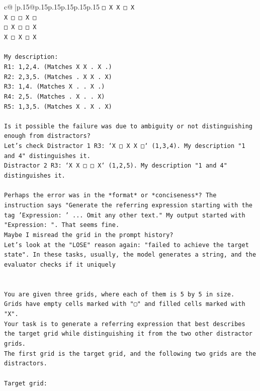\documentclass{article}
\begin{document}
{\begin{supertabular}{c@{$\;$}|p{.15\linewidth}@{}p{.15\linewidth}p{.15\linewidth}p{.15\linewidth}p{.15\linewidth}p{.15\linewidth}}
{{{\texttt{□ X X □ X} \\
\texttt{X □ □ X □} \\
\texttt{□ X □ □ X} \\
\texttt{X □ X □ X} \\
\\ 
\texttt{My description:} \\
\texttt{R1: 1,2,4. (Matches X X . X .)} \\
\texttt{R2: 2,3,5. (Matches . X X . X)} \\
\texttt{R3: 1,4. (Matches X . . X .)} \\
\texttt{R4: 2,5. (Matches . X . . X)} \\
\texttt{R5: 1,3,5. (Matches X . X . X)} \\
\\ 
\texttt{Is it possible the failure was due to ambiguity or not distinguishing enough from distractors?} \\
\texttt{Let's check Distractor 1 R3: `X □ X X □` (1,3,4). My description "1 and 4" distinguishes it.} \\
\texttt{Distractor 2 R3: `X X □ □ X` (1,2,5). My description "1 and 4" distinguishes it.} \\
\\ 
\texttt{Perhaps the error was in the *format* or *conciseness*? The instruction says "Generate the referring expression starting with the tag 'Expression: ' ... Omit any other text." My output started with "Expression: ". That seems fine.} \\
\texttt{Maybe I misread the grid in the prompt history?} \\
\texttt{Let's look at the "LOSE" reason again: "failed to achieve the target state". In these tasks, usually, the model generates a string, and the evaluator checks if it uniquely} \\
\\ 
\\ 
\texttt{You are given three grids, where each of them is 5 by 5 in size.} \\
\texttt{Grids have empty cells marked with "▢" and filled cells marked with "X".} \\
\texttt{Your task is to generate a referring expression that best describes the target grid while distinguishing it from the two other distractor grids.} \\
\texttt{The first grid is the target grid, and the following two grids are the distractors.} \\
\\ 
\texttt{Target grid:} \\
}}}
\end{supertabular}}
\end{document}
